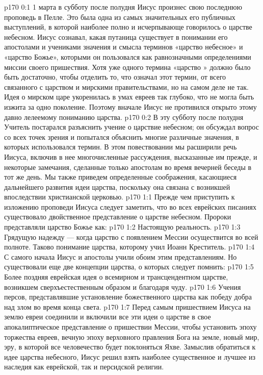 \author{Комиссия срединников}
\vs p170 0:1 1 марта в субботу после полудня Иисус произнес свою последнюю проповедь в Пелле. Это была одна из самых значительных его публичных выступлений, в которой наиболее полно и исчерпывающе говорилось о царстве небесном. Иисус сознавал, какая путаница существует в понимании его апостолами и учениками значения и смысла терминов «царство небесное» и «царство Божье», которыми он пользовался как равнозначными определениями миссии своего пришествия. Хотя уже одного термина «царство » должно было быть достаточно, чтобы отделить то, что означал этот термин, от всего связанного с  царством и мирскими правительствами, но на самом деле не так. Идея о мирском царе укоренилась в умах евреев так глубоко, что не могла быть изжита за одно поколение. Поэтому вначале Иисус не противился открыто этому давно лелеемому пониманию царства.
\vs p170 0:2 В эту субботу после полудня Учитель постарался разъяснить учение о царствие небесном; он обсуждал вопрос со всех точек зрения и попытался объяснить многие различные значения, в которых использовался термин. В этом повествовании мы расширили речь Иисуса, включив в нее многочисленные рассуждения, высказанные им прежде, и некоторые замечания, сделанные только апостолам во время вечерней беседы в тот же день. Мы также приведем определенные соображения, касающиеся дальнейшего развития идеи царства, поскольку она связана с возникшей впоследствии христианской церковью.
\vs p170 1:1 Прежде чем приступить к изложению проповеди Иисуса следует заметить, что во всех еврейских писаниях существовало двойственное представление о царстве небесном. Пророки представляли царство Божье как:
\vs p170 1:2 \bibnobreakspace Настоящую реальность.
\vs p170 1:3 \bibnobreakspace Грядущую надежду --- когда царство с появлением Мессии осуществится во всей полноте. Таково понимание царства, которому учил Иоанн Креститель.
\vs p170 1:4 С самого начала Иисус и апостолы учили обоим этим представлениям. Но существовали еще две концепции царства, о которых следует помнить:
\vs p170 1:5 \bibnobreakspace Более поздняя еврейская идея о всемирном и трансцендентном царстве, возникшем сверхъестественным образом и благодаря чуду.
\vs p170 1:6 \bibnobreakspace Учения персов, представлявшие установление божественного царства как победу добра над злом во время конца света.
\vs p170 1:7 \pc Перед самым пришествием Иисуса на землю евреи соединили и включили все эти идеи о царстве в свое апокалиптическое представление о пришествии Мессии, чтобы установить эпоху торжества евреев, вечную эпоху верховного правления Бога на земле, новый мир, эру, в которой все человечество будет поклоняться Яхве. Замыслив обратиться к идее царства небесного, Иисус решил взять наиболее существенное и лучшее из наследия как еврейской, так и персидской религии.

